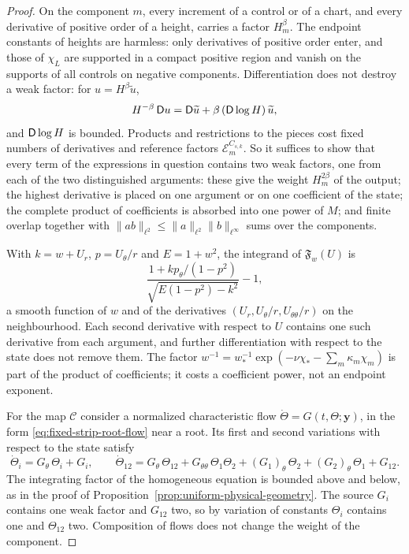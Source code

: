 \begin{proof}
On the component $m$, every increment of a control or of a chart, and
every derivative of positive order of a height, carries a factor
$H_m^\beta$. The endpoint constants of heights are harmless: only
derivatives of positive order enter, and those of $\chi_L$ are
supported in a compact positive region and vanish on the supports of
all controls on negative components. Differentiation does not
destroy a weak factor: for $u=H^\beta\widetilde u$,
\[
 H^{-\beta}\,\mathsf D u=\mathsf D\widetilde u+\beta\,(\mathsf D\log H)\,\widetilde u ,
\]
and $\mathsf D\log H$ is bounded. Products and restrictions to the pieces
cost fixed numbers of derivatives and reference factors
$\mathcal E_m^{C_{s,k}}$. So it suffices to show that every term of
the expressions in question contains two weak factors, one from each
of the two distinguished arguments: these give the weight
$H_m^{2\beta}$ of the output; the highest derivative is placed on one
argument or on one coefficient of the state; the complete product of
coefficients is absorbed into one power of $M$; and finite overlap
together with $\|ab\|_{\ell^2}\le\|a\|_{\ell^2}\|b\|_{\ell^\infty}$
sums over the components.

With $k=w+U_r$, $p=U_\theta/r$ and $E=1+w^2$, the integrand of
$\mathfrak F_w(U)$ is
\[
 \frac{1+kp_\theta/(1-p^2)}{\sqrt{E(1-p^2)-k^2}}-1 ,
\]
a smooth function of $w$ and of the derivatives
$(U_r,U_\theta/r,U_{\theta\theta}/r)$ on the neighbourhood. Each
second derivative with respect to $U$ contains one such derivative
from each argument, and further differentiation with respect to the
state does not remove them. The factor
$w^{-1}=w_*^{-1}\exp(-\nu\chi_*-\sum_m\kappa_m\chi_m)$ is part of the
product of coefficients; it costs a coefficient power, not an
endpoint exponent.

For the map $\mathcal C$ consider a normalized characteristic flow
$\dot\Theta=G(t,\Theta;\mathbf y)$, in the form
\eqref{eq:fixed-strip-root-flow} near a root. Its first and second
variations with respect to the state satisfy
\[
 \dot\Theta_i=G_\theta\,\Theta_i+G_i,
 \qquad
 \dot\Theta_{12}=G_\theta\,\Theta_{12}
   +G_{\theta\theta}\,\Theta_1\Theta_2
   +(G_1)_\theta\,\Theta_2+(G_2)_\theta\,\Theta_1+G_{12} .
\]
The integrating factor of the homogeneous equation is bounded above
and below, as in the proof of
Proposition~\ref{prop:uniform-physical-geometry}. The source $G_i$
contains one weak factor and $G_{12}$ two, so by variation of
constants $\Theta_i$ contains one and $\Theta_{12}$ two. Composition
of flows does not change the weight of the component.


\end{proof}
